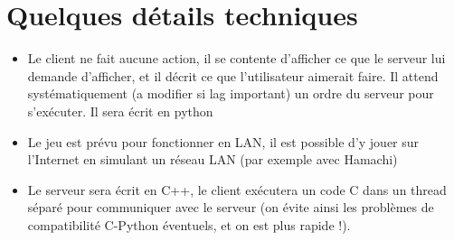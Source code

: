 \documentclass[a4paper]{article}
\begin{document}
	\section*{Quelques détails techniques}
	\begin{itemize}[label={}]
	\item Le client ne fait aucune action, il se contente d'afficher ce que le serveur lui demande d'afficher, et il décrit ce que l'utilisateur aimerait faire. Il attend systématiquement (a modifier si lag important) un ordre du serveur pour s'exécuter. Il sera écrit en python
	\item Le jeu est prévu pour fonctionner en LAN, il est possible d'y jouer sur l'Internet en simulant un réseau LAN (par exemple avec Hamachi)
	\item Le serveur sera écrit en C++, le client exécutera un code C dans un thread séparé pour communiquer avec le serveur (on évite ainsi les problèmes de compatibilité C-Python éventuels, et on est plus rapide !).
	\end{itemize}
\end{document}

